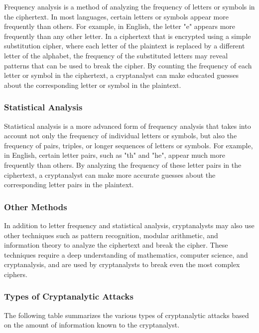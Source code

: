 \documentclass[11pt]{article}
\begin{document}
Frequency analysis is a method of analyzing the frequency of letters or symbols in the ciphertext. In most languages, certain letters or symbols appear more frequently than others. For example, in English, the letter "e" appears more frequently than any other letter. In a ciphertext that is encrypted using a simple substitution cipher, where each letter of the plaintext is replaced by a different letter of the alphabet, the frequency of the substituted letters may reveal patterns that can be used to break the cipher. By counting the frequency of each letter or symbol in the ciphertext, a cryptanalyst can make educated guesses about the corresponding letter or symbol in the plaintext.

\subsubsection{Statistical Analysis}


Statistical analysis is a more advanced form of frequency analysis that takes into account not only the frequency of individual letters or symbols, but also the frequency of pairs, triples, or longer sequences of letters or symbols. For example, in English, certain letter pairs, such as "th" and "he", appear much more frequently than others. By analyzing the frequency of these letter pairs in the ciphertext, a cryptanalyst can make more accurate guesses about the corresponding letter pairs in the plaintext.

\subsubsection{Other Methods}

In addition to letter frequency and statistical analysis, cryptanalysts may also use other techniques such as pattern recognition, modular arithmetic, and information theory to analyze the ciphertext and break the cipher. These techniques require a deep understanding of mathematics, computer science, and cryptanalysis, and are used by cryptanalysts to break even the most complex ciphers.

\subsubsection{Types of Cryptanalytic Attacks}

The following table summarizes the various types of cryptanalytic attacks based on the amount of information known to the cryptanalyst.
\end{document}
